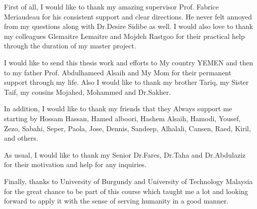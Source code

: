 First of all, I would like to thank my amazing supervisor Prof. Fabrice Meriaudeau for his consistent support and clear directions.
He never felt annoyed from my questions along with Dr.Desire Sidibe as well.
I would also love to thank my colleagues Glemaitre Lemaitre and Mojdeh Rastgoo for their practical help through the duration of my master project.

I would like to send this thesis work and efforts to My country YEMEN and then to my father Prof. Abdulhameed Alsaih and My Mom for their permanent support through my life.
Also I would like to thank my brother Tariq, my Sister Taif, my cousins Mojahed, Mohammed and Dr.Sakher. 

In addition, I would like to thank my friends that they Always support me starting by Hossam Hassan, Hamed alboori, Hashem Alsaih, Hamodi, Yousef, Zezo, Sabahi, Seper, Paola, Jose, Dennis, Sandeep, Alhalali, Cansen, Raed, Kiril, and others.

As usual, I would like to thank my Senior Dr.Fares, Dr.Taha and Dr.Abdulaziz for their motivation and help for any inquiries.   

Finally, thanks to University of Burgundy and University of Technology Malaysia for the great chance to be part of this course which taught me a lot and looking forward to apply it with the sense of serving humanity in a good manner.

\pagestyle{fancy}


